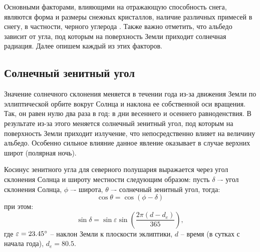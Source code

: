 \documentclass[a4paper, fontsize=14pt]{scrartcl}
\begin{document}
Основными факторами, влияющими на отражающую способность снега, являются форма и размеры снежных кристаллов, наличие различных примесей в снегу, в частности, черного углерода \cite{Bak2019}. Также важно отметить, что альбедо зависит от угла, под которым на поверхность Земли приходит солнечная радиация. Далее опишем каждый из этих факторов.


\subsection{Солнечный зенитный угол}

Значение солнечного склонения меняется в течении года из-за движения Земли по эллиптической орбите вокруг Солнца и наклона ее собственной оси вращения. Так, он равен нулю два раза в год: в дни весеннего и осеннего равноденствия. В результате из-за этого меняется солнечный зенитный угол, под которым на поверхность Земли приходит излучение, что непосредственно влияет на величину альбедо. Особенно сильное влияние данное явление оказывает в случае верхних широт (полярная ночь). 

Косинус зенитного угла для северного полушария выражается через угол склонения Солнца и широту местности следующим образом: пусть $\delta$ –- угол склонения Солнца, $\phi$ –- широта, $\theta$ –- солнечный зенитный угол, тогда:
\begin{equation}
    \cos \theta = \cos ( \phi - \delta ) \label{sys}
\end{equation}
при этом:
\begin{equation}
    \sin \delta = \sin \varepsilon \sin \left(\dfrac{2 \pi (d - d_e)}{365} \right) ,  \label{sys}
\end{equation}
где $\varepsilon = 23.45 \degree$  – наклон Земли к плоскости эклиптики, $d$ – время (в сутках с начала года), $d_e = 80.5$.
\end{document}
